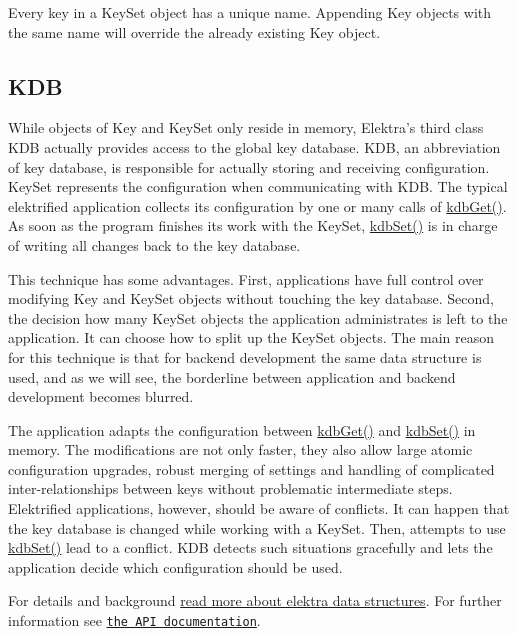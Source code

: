 Every key in a {\ttfamily Key\+Set} object has a unique name. Appending {\ttfamily Key} objects with the same name will override the already existing {\ttfamily Key} object.

\subsection*{K\+DB}

While objects of {\ttfamily Key} and {\ttfamily Key\+Set} only reside in memory, Elektra’s third class {\ttfamily K\+DB} actually provides access to the global key database. {\ttfamily K\+DB}, an abbreviation of key database, is responsible for actually storing and receiving configuration. {\ttfamily Key\+Set} represents the configuration when communicating with {\ttfamily K\+DB}. The typical elektrified application collects its configuration by one or many calls of {\ttfamily \hyperlink{group__kdb_ga28e385fd9cb7ccfe0b2f1ed2f62453a1}{kdb\+Get()}}. As soon as the program finishes its work with the {\ttfamily Key\+Set}, {\ttfamily \hyperlink{group__kdb_ga11436b058408f83d303ca5e996832bcf}{kdb\+Set()}} is in charge of writing all changes back to the key database.

This technique has some advantages. First, applications have full control over modifying {\ttfamily Key} and {\ttfamily Key\+Set} objects without touching the key database. Second, the decision how many {\ttfamily Key\+Set} objects the application administrates is left to the application. It can choose how to split up the {\ttfamily Key\+Set} objects. The main reason for this technique is that for backend development the same data structure is used, and as we will see, the borderline between application and backend development becomes blurred.

The application adapts the configuration between {\ttfamily \hyperlink{group__kdb_ga28e385fd9cb7ccfe0b2f1ed2f62453a1}{kdb\+Get()}} and {\ttfamily \hyperlink{group__kdb_ga11436b058408f83d303ca5e996832bcf}{kdb\+Set()}} in memory. The modifications are not only faster, they also allow large atomic configuration upgrades, robust merging of settings and handling of complicated inter-\/relationships between keys without problematic intermediate steps. Elektrified applications, however, should be aware of conflicts. It can happen that the key database is changed while working with a {\ttfamily Key\+Set}. Then, attempts to use {\ttfamily \hyperlink{group__kdb_ga11436b058408f83d303ca5e996832bcf}{kdb\+Set()}} lead to a conflict. {\ttfamily K\+DB} detects such situations gracefully and lets the application decide which configuration should be used.

For details and background \hyperlink{doc_dev_data-structures_md}{read more about elektra data structures}. For further information see \href{https://doc.libelektra.org/api/current/html/}{\tt the A\+PI documentation}. 